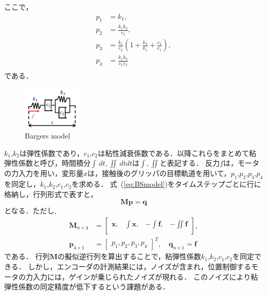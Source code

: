 \documentclass[a4paper]{jarticle}
\begin{document}
ここで，
\begin{equation}
    \begin{aligned}
        p_1 &= k_1,  \\
        p_2 &= \frac{k_1 k_2}{c_2},    \\
        p_3 &= \frac{k_1}{c_2}\left(1+\frac{k_2}{k_1}+\frac{c_2}{c_1}\right),\\
        p_4 &= \frac{k_1k_2}{c_1 c_2} \\
    \end{aligned}
    \label{eq:p2ck}
\end{equation}
である．
\begin{figure}[htbp]
    \centering
    \includegraphics[width=0.25\textwidth]{BS_model.pdf}
    \caption{Bargers model}
    \label{fig:BS_model}
\end{figure}
$k_1$,$k_2$は弾性係数であり，$c_1$,$c_2$は粘性減衰係数である．以降これらをまとめて粘弾性係数と呼び，時間積分$\int \,dt, \iint \,dtdt $は$\int, \iint$と表記する．
反力$f$は，モータの力入力を用い，変形量$x$は，接触後のグリッパの目標軌道を用いて，$p_1$,$p_2$,$p_3$,$p_4$を同定し，$k_1$,$k_2$,$c_1$,$c_2$を求める．
式~(\ref{eq:BSmodel})をタイムステップごとに行に格納し，行列形式で表すと，
\begin{equation}
    \mathbf{M}\mathbf{p} = \mathbf{q} 
    \label{eq:Mp_q}
\end{equation}
となる．ただし,
\begin{equation}
    \begin{aligned}
        \mathbf{M}_{n \times 4} &= \begin{bmatrix}
            \boldsymbol{x}, & \int{\boldsymbol{x}}, & -\int{\boldsymbol{f}}, & -\iint{\boldsymbol{f}}\\
        \end{bmatrix}, \\
        \mathbf{p}_{4 \times 1}  &= \begin{bmatrix}
            p_1 ,p_2 ,p_3 ,p_4
        \end{bmatrix}^{T}, \quad
        \mathbf{q}_{n \times 1}   = \boldsymbol{f}
    \end{aligned}
\label{eq:BSmodel_matrix}
\end{equation}
である．
行列$\mathbf{M}$の擬似逆行列を算出することで，粘弾性係数$k_1$,$k_2$,$c_1$,$c_2$を同定できる．
しかし，エンコーダの計測結果には，ノイズが含まれ，位置制御するモータの力入力には，ゲインが乗じられたノイズが現れる．
このノイズにより粘弾性係数の同定精度が低下するという課題がある．
\end{document}
